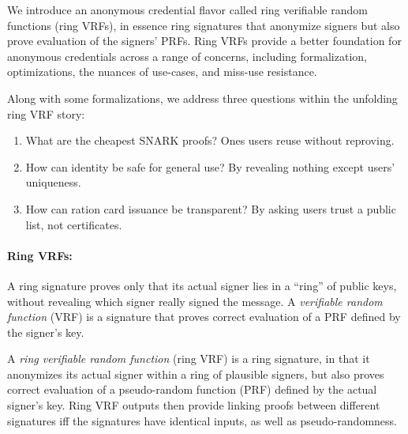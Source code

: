 
\def\qaudbreak{\eprint{\quad}{\\}}


We introduce an anonymous credential flavor called
 ring verifiable random functions (ring VRFs),
in essence ring signatures that anonymize signers but
 also prove evaluation of the signers' PRFs.
Ring VRFs provide a better foundation for anonymous credentials
across a range of concerns, including formalization, optimizations,
the nuances of use-cases, and miss-use resistance.

Along with some formalizations, we address three questions within
the unfolding ring VRF story:
\begin{enumerate} 
\item
What are the cheapest SNARK proofs?  \qaudbreak
Ones users reuse without reproving.
\item
How can identity be safe for general use?  \qaudbreak
By revealing nothing except users' uniqueness.
\item
How can ration card issuance be transparent?  \qaudbreak
By asking users trust a public list, not certificates.
\end{enumerate}


\paragraph{Ring VRFs:}

A ring signature proves only that its actual signer lies in a ``ring''
of public keys, without revealing which signer really signed the message.
A {\it verifiable random function} (VRF) is a signature that proves
correct evaluation of a PRF defined by the signer's key.

A {\it ring verifiable random function} (ring VRF) is a ring signature, in
that it anonymizes its actual signer within a ring of plausible signers,
but also proves correct evaluation of a pseudo-random function (PRF)
defined by the actual signer's key. %
%
Ring VRF outputs then provide linking proofs between different signatures
iff the signatures have identical inputs, as well as pseudo-randomness.

